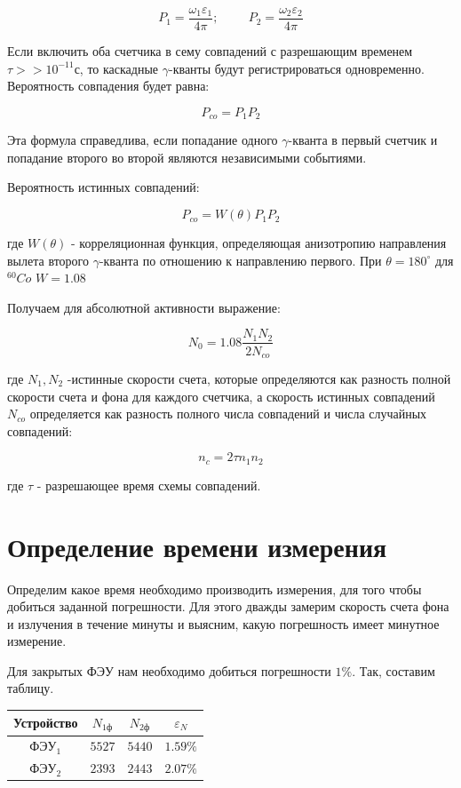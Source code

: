 \documentclass[12pt]{article}
\begin{document}
    $$
      P_1=\frac{\omega _1 \varepsilon _1}{4 \pi}; \hspace{1cm}
      P_2=\frac{\omega _2 \varepsilon _2}{4 \pi}
    $$

    Если включить оба счетчика в сему совпадений с разрешающим временем
    $\tau >> 10^{-11}$с, то каскадные $\gamma$-кванты будут регистрироваться
    одновременно. Вероятность совпадения будет равна:

    $$
      P_{co}=P_1P_2
    $$

    Эта формула справедлива, если попадание одного $\gamma$-кванта  в первый
    счетчик и попадание второго во второй являются независимыми событиями.

    Вероятность истинных совпадений:

    $$
      P_{co}=W(\theta)P_1P_2
    $$

    где $W(\theta)$ - корреляционная функция, определяющая анизотропию
    направления вылета второго $\gamma$-кванта по отношению к направлению
    первого. При $\theta = 180^{\circ}$ для $^{60}Co$ $W=1.08$

    Получаем для абсолютной активности выражение:

    $$
      N_0=1.08 \frac{N_1N_2}{2N_{co}}
    $$

    где $N_1, N_2$ -истинные скорости счета, которые определяются как разность
    полной скорости счета и фона для каждого счетчика, а скорость истинных
    совпадений $N_{co}$ определяется как разность полного числа совпадений и
    числа случайных совпадений:

    $$
      n_c = 2 \tau n_1 n_2
    $$

    где $\tau$ - разрешающее время схемы совпадений.


  \section{Определение времени измерения}

    Определим какое время необходимо производить измерения, для того чтобы
    добиться заданной погрешности. Для этого дважды замерим скорость счета фона
    и излучения в течение минуты и выясним, какую погрешность имеет минутное
    измерение.

    Для закрытых ФЭУ нам необходимо добиться погрешности $1 \%$. Так, составим
    таблицу. \\

    \begin{tabular}{ || c || c | c | c ||}
      \hline
      Устройство & $N_{1ф}$ & $N_{2ф}$ & $\varepsilon_N$ \\ \hline
      ФЭУ$_1$ & $5527$ & $5440$ & $1.59 \%$ \\
      ФЭУ$_2$ & $2393$ & $2443$ & $2.07 \%$ \\
      \hline
    \end{tabular} \\
\end{document}
